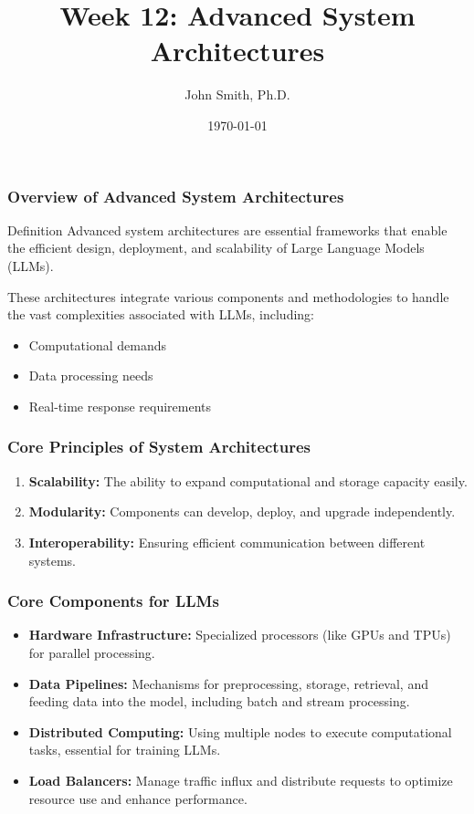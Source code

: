 \documentclass[aspectratio=169]{beamer}
\title[Academic Template]{Week 12: Advanced System Architectures}
\author[J. Smith]{John Smith, Ph.D.}
\institute[University Name]{
  Department of Computer Science\\
  University Name\\
  \vspace{0.3cm}
  Email: email@university.edu\\
  Website: www.university.edu
}
\date{\today}
\begin{document}
\frame{\titlepage}

\begin{frame}[fragile]
    \titlepage
\end{frame}

\begin{frame}[fragile]
    \frametitle{Overview of Advanced System Architectures}
    \begin{block}{Definition}
        Advanced system architectures are essential frameworks that enable the efficient design, deployment, and scalability of Large Language Models (LLMs). 
    \end{block}
    These architectures integrate various components and methodologies to handle the vast complexities associated with LLMs, including:
    \begin{itemize}
        \item Computational demands
        \item Data processing needs
        \item Real-time response requirements
    \end{itemize}
\end{frame}

\begin{frame}[fragile]
    \frametitle{Core Principles of System Architectures}
    \begin{enumerate}
        \item \textbf{Scalability:} The ability to expand computational and storage capacity easily.
        \item \textbf{Modularity:} Components can develop, deploy, and upgrade independently.
        \item \textbf{Interoperability:} Ensuring efficient communication between different systems.
    \end{enumerate}
\end{frame}

\begin{frame}[fragile]
    \frametitle{Core Components for LLMs}
    \begin{itemize}
        \item \textbf{Hardware Infrastructure:} Specialized processors (like GPUs and TPUs) for parallel processing.
        \item \textbf{Data Pipelines:} Mechanisms for preprocessing, storage, retrieval, and feeding data into the model, including batch and stream processing.
        \item \textbf{Distributed Computing:} Using multiple nodes to execute computational tasks, essential for training LLMs.
        \item \textbf{Load Balancers:} Manage traffic influx and distribute requests to optimize resource use and enhance performance.
    \end{itemize}
\end{frame}
\end{document}
